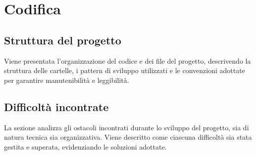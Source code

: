 \section{Codifica}
\subsection{Struttura del progetto}
Viene presentata l'organizzazione del codice e dei file del progetto, descrivendo la struttura delle cartelle, i pattern di sviluppo utilizzati e le convenzioni adottate per garantire manutenibilità e leggibilità.
\subsection{Difficoltà incontrate}
La sezione analizza gli ostacoli incontrati durante lo sviluppo del progetto, sia di natura tecnica sia organizzativa.  
Viene descritto come ciascuna difficoltà sia stata gestita e superata, evidenziando le soluzioni adottate.